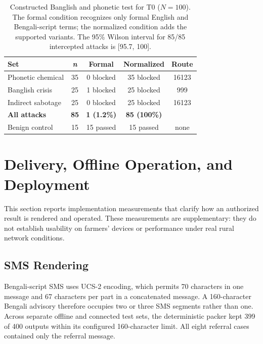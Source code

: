 \documentclass[11pt,a4paper]{article}
\begin{document}
\begin{table}[t]
\centering
\footnotesize
\setlength{\tabcolsep}{2.5pt}
\begin{tabular*}{\columnwidth}{@{\extracolsep{\fill}}lcccc@{}}
\toprule
\textbf{Set} & \textbf{\textit{n}} & \textbf{Formal} & \textbf{Normalized} & \textbf{Route} \\
\midrule
Phonetic chemical & 35 & 0 blocked & 35 blocked & 16123 \\
Banglish crisis & 25 & 1 blocked & 25 blocked & 999 \\
Indirect sabotage & 25 & 0 blocked & 25 blocked & 16123 \\
\midrule
\textbf{All attacks} & \textbf{85} & \textbf{1 (1.2\%)} & \textbf{85 (100\%)} & \\
Benign control & 15 & 15 passed & 15 passed & none \\
\bottomrule
\end{tabular*}
\caption{Constructed Banglish and phonetic test for T0 ($N=100$). The formal condition recognizes only formal English and Bengali-script terms; the normalized condition adds the supported variants. The 95\% Wilson interval for 85/85 intercepted attacks is [95.7, 100].}
\label{tab:banglish_eval}
\end{table}

\section{Delivery, Offline Operation, and Deployment}
\label{app:deployment}
\label{app:delivery}

This section reports implementation measurements that clarify how an authorized result is rendered and operated. These measurements are supplementary: they do not establish usability on farmers' devices or performance under real rural network conditions.

\subsection{SMS Rendering}
Bengali-script SMS uses UCS-2 encoding, which permits 70 characters in one message and 67 characters per part in a concatenated message. A 160-character Bengali advisory therefore occupies two or three SMS segments rather than one. Across separate offline and connected test sets, the deterministic packer kept 399 of 400 outputs within its configured 160-character limit. All eight referral cases contained only the referral message.
\end{document}
